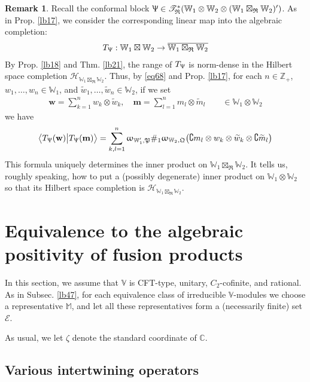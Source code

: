 \documentclass[11pt,b5paper,notitlepage]{article}
\theoremstyle{definition}
\newtheorem{rem}[df]{Remark}
\theoremstyle{plain}
\newcommand{\fk}{\mathfrak}
\newcommand{\mc}{\mathcal}
\newcommand{\wtd}{\widetilde}
\newcommand{\ovl}{\overline}
\newcommand{\bigbk}[1]{\big\langle {#1}\big\rangle}
\newcommand{\scr}{\mathscr}
\newcommand{\Co}{\complement}
\newcommand{\mbf}{\mathbf}
\newcommand{\Vbb}{\mathbb V}
\newcommand{\Wbb}{\mathbb W}
\newcommand{\Mbb}{\mathbb M}
\newcommand{\Cbb}{\mathbb C}
\newcommand{\Zbb}{\mathbb Z}
\newcommand{\wbf}{\mathbf w}
\numberwithin{equation}{section}
\begin{document}
\begin{rem}
Recall the conformal block $\Uppsi\in\scr T_{\fk R}^*(\Wbb_1\otimes\Wbb_2\otimes(\Wbb_1\boxtimes_{\fk R}\Wbb_2)')$. As in Prop. \ref{lb17}, we consider the corresponding linear map into the algebraic completion:
\begin{align*}
T_\Uppsi:\Wbb_1\boxtimes\Wbb_2\rightarrow \ovl{\Wbb_1\boxtimes_{\fk R}\Wbb_2}
\end{align*}
By Prop. \ref{lb18} and Thm. \ref{lb21}, the range of $T_\Uppsi$ is norm-dense in the Hilbert space completion $\mc H_{\Wbb_1\boxtimes_{\fk R}\Wbb_2}$.  Thus, by \eqref{eq68} and Prop. \ref{lb17}, for each $n\in\Zbb_+$, $w_1,\dots,w_n\in\Wbb_1$, and $\wtd w_1,\dots,\wtd w_n\in\Wbb_2$, if we set
\begin{align*}
\wbf=\sum_{k=1}^n w_k\otimes \wtd w_k,\quad\mbf m=\sum_{l=1}^n m_l\otimes\wtd m_l\qquad\in \Wbb_1\otimes\Wbb_2 
\end{align*}
we have
\begin{align}
\bigbk{T_{\Uppsi}(\wbf)\big|T_{\Uppsi}(\mbf m) }=\sum_{k,l=1}^n\upomega_{\Wbb_1',\fk P}\#_1\upomega_{\Wbb_2,\fk Q}\big(\Co m_l\otimes  w_k\otimes  \wtd w_k \otimes \Co\wtd m_l\big)
\end{align}
This formula uniquely determines the inner product on $\Wbb_1\boxtimes_{\fk R}\Wbb_2$. It tells us, roughly speaking, how to put a (possibly degenerate) inner product on $\Wbb_1\otimes\Wbb_2$ so that its Hilbert space completion is $\mc H_{\Wbb_1\boxtimes_{\fk R}\Wbb_2}$.
\end{rem}



\section{Equivalence to the algebraic positivity of fusion products}\label{lb69}

In this section, we assume that $\Vbb$ is CFT-type, unitary, $C_2$-cofinite, and rational. As in Subsec. \ref{lb47}, for each equivalence class of irreducible $\Vbb$-modules we choose a representative $\Mbb$, and let all these representatives form a (necessarily finite) set $\mc E$.

As usual, we let $\zeta$ denote the standard coordinate of $\Cbb$.

\subsection{Various intertwining operators}
\end{document}
